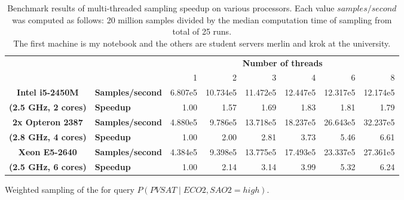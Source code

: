 \documentclass[english,cover]{fitthesis} %
\newcommand{\ignore}[1]{}                  %
\begin{document}
\begin{table}[htb]
\begin{center}
\begin{adjustwidth}{-0.85cm}{-0.75cm}
{    \bigskip
    \begin{subfigure}[b]{\linewidth}
        \begin{tabular}{|c|l|r|r|r|r|r|r|}
            \cline{3-8}
            \multicolumn{2}{c|}{} & \multicolumn{6}{c|}{\textbf{Number of threads}}\\
            \cline{3-8}
            \multicolumn{2}{c|}{} & 1 & 2 & 3 & 4 & 6 & 8\\ %
            \hline
            \textbf{Intel i5-2450M} & \textbf{Samples/second}
                & 6.807e5 & 10.734e5 & 11.472e5 & 12.447e5 & 12.317e5 & 12.174e5\\
            \cline{2-8}
            \textbf{(2.5 GHz, 2 cores)} & \textbf{Speedup}
                & 1.00 & 1.57 & 1.69 & 1.83 & 1.81 & 1.79\\
            \hline \hline
            \textbf{2x Opteron 2387} & \textbf{Samples/second}
                & 4.880e5 & 9.786e5 & 13.718e5 & 18.237e5 & 26.643e5 & 32.237e5\\
            \cline{2-8}
            \textbf{(2.8 GHz, 4 cores)} & \textbf{Speedup}
                & 1.00 & 2.00 & 2.81 & 3.73 & 5.46 & 6.61\\
            \hline \hline
            \textbf{Xeon E5-2640} & \textbf{Samples/second}
                & 4.384e5 & 9.398e5 & 13.775e5 & 17.493e5 & 23.337e5 & 27.361e5\\
            \cline{2-8}
            \textbf{(2.5 GHz, 6 cores)} & \textbf{Speedup}
                & 1.00 & 2.14 & 3.14 & 3.99 & 5.32 & 6.24\\
            \hline
        \end{tabular}
        \caption{Weighted sampling of the  for query $P(PVSAT \mid ECO2, SAO2 = high)$.}
    \end{subfigure}
    }
    \end{adjustwidth}
    \caption{Benchmark results of multi-threaded sampling speedup on various processors. Each value $samples/second$ was computed as follows: 20 million samples divided by the median computation time of sampling from total of 25 runs.
    \ignore{Median was used because sometimes the computation was really slow (typically the very first sampling)}\\
    The first machine is my notebook and the others are student servers merlin and krok at the university.
    }
    \label{tbl:sampling_multithread_speedup}
    \end{center}
\end{table}
\end{document}
